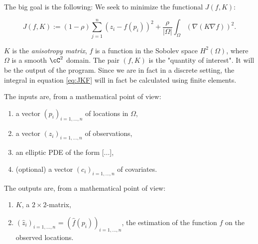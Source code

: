 The big goal is the following: We seek to minimize the functional $J(f,K)$:

\begin{equation}\label{eq:JFK}
	J(f,K) := (1-\rho)\sum_{j=1}^n \left(z_i - f(p_i)\right)^2 + \frac{\rho}{|\Omega|}\int_\Omega (\nabla(K\nabla f))^2.
\end{equation}

$K$ is the \emph{anisotropy matrix}, $f$ is a function in the Sobolev space $H^2(\Omega)$, where $\Omega$ is a smooth $\cC^2$ domain.
The pair $(f,K)$ is the "quantity of interest". It will be the output of the program. Since we are in fact in a discrete setting, the integral in equation \eqref{eq:JKF} will in fact be calculated using finite elements.

The inputs are, from a mathematical point of view:
\begin{enumerate}
	\item a vector $(p_i)_{i=1,\hdots,n}$ of locations in $\Omega$,
	\item a vector $(z_i)_{i=1,\hdots,n}$ of observations,
	\item an elliptic PDE of the form [...],
	\item (optional) a vector $(c_i)_{i=1,\hdots,n}$ of covariates.
\end{enumerate}

The outputs are, from a mathematical point of view:
\begin{enumerate}
	\item $K$, a $2\times 2$-matrix,
	\item $(\hat{z}_i)_{i=1,\hdots,n}$ = $(\hat{f}(p_i))_{i=1,\hdots,n}$, the estimation of the function $f$ on the observed locations.
\end{enumerate}
